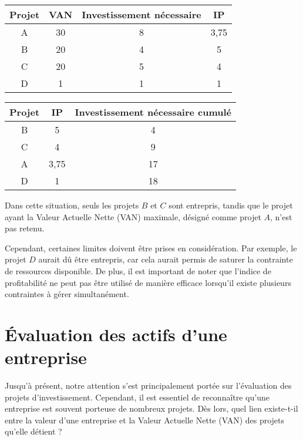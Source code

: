 \documentclass[a4paper, 12pt]{report}
\begin{document}
\begin{center}
	\begin{tabular}{@{}cccc@{}}
	\toprule
	Projet & VAN & Investissement nécessaire & IP   \\ \midrule
	A      & 30  & 8                         & 3,75 \\
	B      & 20  & 4                         & 5    \\
	C      & 20  & 5                         & 4    \\
	D      & 1   & 1                         & 1    \\ \bottomrule
\end{tabular}

\end{center}
\begin{center}
	
\begin{tabular}{@{}ccc@{}}
	\toprule
	Projet & IP   & Investissement nécessaire cumulé \\ \midrule
	B      & 5    & 4                                \\
	C      & 4    & 9                                \\
	A      & 3,75 & 17                               \\
	D      & 1    & 18                               \\ \bottomrule
\end{tabular}

\end{center}

Dans cette situation, seuls les projets \( B \) et \( C \) sont entrepris, tandis que le projet ayant la Valeur Actuelle Nette (VAN) maximale, désigné comme projet \( A \), n'est pas retenu. 

Cependant, certaines limites doivent être prises en considération. Par exemple, le projet \( D \) aurait dû être entrepris, car cela aurait permis de saturer la contrainte de ressources disponible. De plus, il est important de noter que l'indice de profitabilité ne peut pas être utilisé de manière efficace lorsqu'il existe plusieurs contraintes à gérer simultanément.

\chapter{Évaluation des actifs d'une entreprise}

Jusqu'à présent, notre attention s'est principalement portée sur l'évaluation des projets d'investissement. Cependant, il est essentiel de reconnaître qu'une entreprise est souvent porteuse de nombreux projets. Dès lors, quel lien existe-t-il entre la valeur d'une entreprise et la Valeur Actuelle Nette (VAN) des projets qu'elle détient ?
\end{document}
